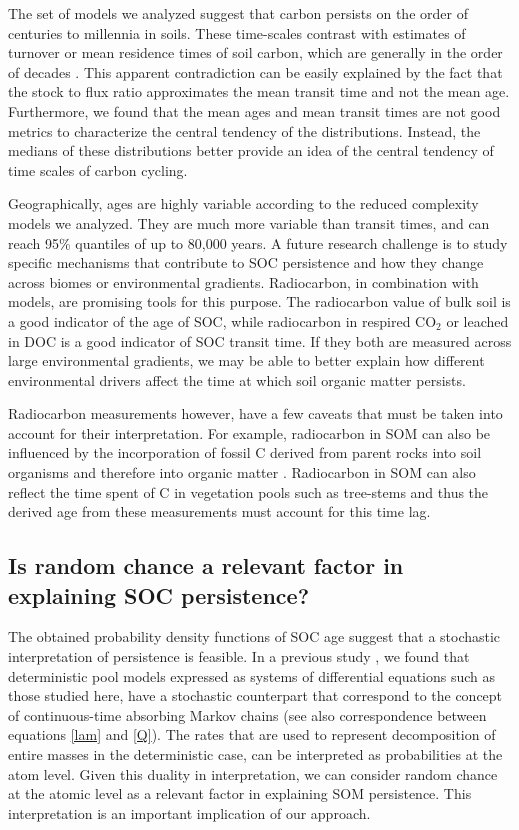 \documentclass[draft,linenumbers]{agujournal}
\begin{document}
The set of models we analyzed suggest that carbon persists on the order of centuries to millennia in soils. These time-scales contrast with estimates of turnover or mean residence times of soil carbon, which are generally in the order of decades \citep{Carvalhais2014, Wang2018}. This apparent contradiction can be easily explained by the fact that the stock to flux ratio approximates the mean transit time and not the mean age. Furthermore, we found that the mean ages and mean transit times are not good metrics to characterize the central tendency of the distributions. Instead, the medians of these distributions better provide an idea of the central tendency of time scales of carbon cycling. 

Geographically, ages are highly variable according to the reduced complexity models we analyzed. They are much more variable than transit times, and can reach 95\% quantiles of up to 80,000 years. A future research challenge is to study specific mechanisms that contribute to SOC persistence and how they change across biomes or environmental gradients. Radiocarbon, in combination with models, are promising tools for this purpose. The radiocarbon value of bulk soil is a good indicator of the age of SOC, while radiocarbon in respired CO$_2$ or leached in DOC is a good indicator of SOC transit time. If they both are measured across large environmental gradients, we may be able to better explain how different environmental drivers affect the time at which soil organic matter persists. 

Radiocarbon measurements however, have a few caveats that must be taken into account for their interpretation. For example, radiocarbon in SOM can also be influenced by the incorporation  of fossil C derived from parent rocks into soil organisms and therefore into organic matter \citep{Seifert2013}. Radiocarbon in SOM can also reflect the time spent of C in vegetation pools such as tree-stems and thus the derived age from these measurements must account for this time lag.

\subsection{Is random chance a relevant factor in explaining SOC persistence?}
The obtained probability density functions of SOC age suggest that a stochastic interpretation of persistence is feasible. In a previous study \citep{Metzler2018MG}, we found that deterministic pool models expressed as systems of differential equations such as those studied here, have a stochastic counterpart that correspond to the concept of continuous-time absorbing Markov chains (see also correspondence between equations \ref{lam} and \ref{Q}). The rates that are used to represent decomposition of entire masses in the deterministic case, can be interpreted as probabilities at the atom level. Given this duality in interpretation, we can consider random chance at the atomic level as a relevant factor in explaining SOM persistence. This interpretation is an important implication of our approach. 
\end{document}
